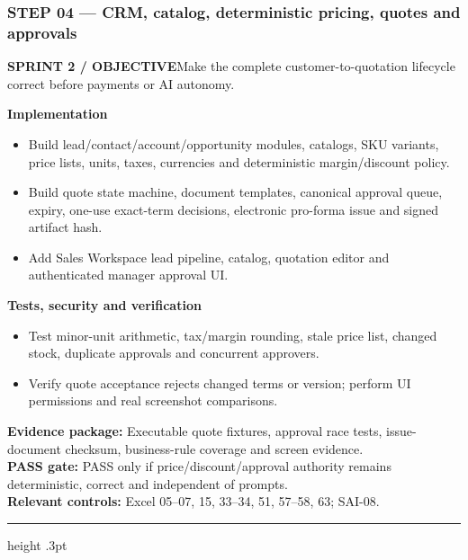 \documentclass[10.5pt,a4paper,oneside]{article}
\newcommand{\eyebrow}[1]{{\sffamily\footnotesize\bfseries\color{gold}\MakeUppercase{#1}}}
\begin{document}
\subsubsection*{STEP 04 --- CRM, catalog, deterministic pricing, quotes and approvals}
\eyebrow{Sprint 2 / objective}\quad Make the complete customer-to-quotation lifecycle correct before payments or AI autonomy.
\begin{tcolorbox}[colback=warm,colframe=line,boxrule=.45pt,arc=2pt,left=8pt,right=8pt,top=6pt,bottom=6pt]\textbf{Implementation}
\begin{itemize}
\item Build lead/contact/account/opportunity modules, catalogs, SKU variants, price lists, units, taxes, currencies and deterministic margin/discount policy.
\item Build quote state machine, document templates, canonical approval queue, expiry, one-use exact-term decisions, electronic pro-forma issue and signed artifact hash.
\item Add Sales Workspace lead pipeline, catalog, quotation editor and authenticated manager approval UI.
\end{itemize}
\textbf{Tests, security and verification}
\begin{itemize}
\item Test minor-unit arithmetic, tax/margin rounding, stale price list, changed stock, duplicate approvals and concurrent approvers.
\item Verify quote acceptance rejects changed terms or version; perform UI permissions and real screenshot comparisons.
\end{itemize}
\textbf{Evidence package:} Executable quote fixtures, approval race tests, issue-document checksum, business-rule coverage and screen evidence.\\
\textbf{PASS gate:} PASS only if price/discount/approval authority remains deterministic, correct and independent of prompts.\\
\textbf{Relevant controls:} Excel 05--07, 15, 33--34, 51, 57--58, 63; SAI-08.
\end{tcolorbox}
\medskip\hrule height .3pt\medskip\Needspace{100mm}
\end{document}
